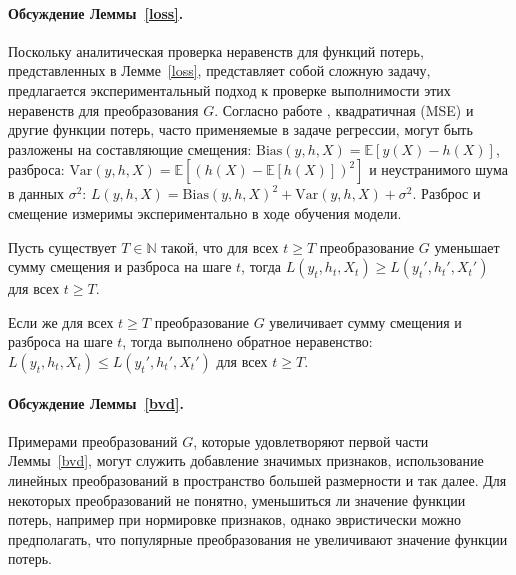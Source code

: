         \paragraph{Обсуждение Леммы~\ref{loss}.} Поскольку аналитическая проверка неравенств для функций потерь, представленных в Лемме~\ref{loss}, представляет собой сложную задачу, предлагается экспериментальный подход к проверке выполнимости этих неравенств для преобразования $G$. Согласно работе \cite{domingos2000unified}, квадратичная (MSE) и другие функции потерь, часто применяемые в задаче регрессии, могут быть разложены на составляющие смещения: $\text{Bias}(y, h, X) = \mathbb{E}\left[ y(X) - h(X)\right]$, разброса: $\text{Var}(y, h, X) = \mathbb{E}\left[ \left(h(X) - \mathbb{E}\left[ h(X) \right] \right)^2\right]$ и неустранимого шума в данных $\sigma^2$:
        $L(y, h, X) = \text{Bias}(y, h, X)^2 + \text{Var}(y, h, X) + \sigma^2.$
        Разброс и смещение измеримы экспериментально в ходе обучения модели.

        \begin{lemma}[Веприков, 2024] \label{bvd}
            Пусть существует $T \in \mathbb{N}$ такой, что для всех $t \geq T$ преобразование $G$ уменьшает сумму смещения и разброса на шаге $t$, тогда $L(y_t, h_t, X_t) \geq L(y_t', h_t', X_t')$ для всех $t \geq T$.
            
	        Если же для всех $t \geq T$ преобразование $G$ увеличивает сумму смещения и разброса на шаге $t$, тогда выполнено обратное неравенство: $L(y_t, h_t, X_t) \leq L(y_t', h_t', X_t')$ для всех $t \geq T$.
        \end{lemma}

        \paragraph{Обсуждение Леммы~\ref{bvd}.} Примерами преобразований $G$, которые удовлетворяют первой части Леммы~\ref{bvd}, могут служить добавление значимых признаков, использование линейных преобразований в пространство большей размерности и так далее. Для некоторых преобразований не понятно, уменьшиться ли значение функции потерь, например при нормировке признаков, однако эвристически можно предполагать, что популярные преобразования не увеличивают значение функции потерь.



        

        


        

    
    

        